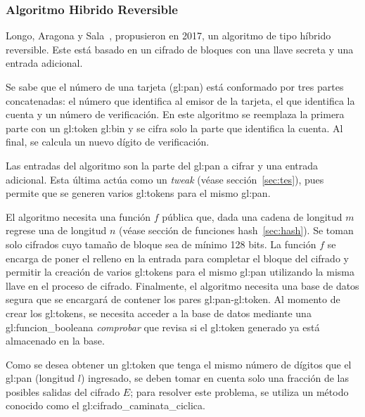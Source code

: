 %
%

\subsubsection{Algoritmo Hibrido Reversible}
\label{sec:ahr}
Longo, Aragona y Sala~\cite{aragona}, propusieron en 2017, un algoritmo de
tipo híbrido reversible. Este está basado en un cifrado de bloques con una
llave secreta y una entrada adicional.

Se sabe que el número de una tarjeta (\gls{gl:pan}) está conformado por tres
partes concatenadas: el número que identifica al emisor de la tarjeta, el que
identifica la cuenta y un número de verificación. En este algoritmo se reemplaza
la primera parte con un \gls{gl:token} \gls{gl:bin} y se cifra solo la parte
que identifica la cuenta. Al final, se calcula un nuevo dígito de verificación.

Las entradas del algoritmo son la parte del \gls{gl:pan} a cifrar y una entrada
adicional. Esta última actúa como un \textit{tweak} (véase
sección~\ref{sec:tes}), pues permite que se generen varios \glspl{gl:token}
para el mismo \gls{gl:pan}.

El algoritmo necesita una función $f$ pública que, dada una cadena
de longitud $m$ regrese una de longitud $n$ (véase sección de funciones
hash~\ref{sec:hash}). Se toman solo cifrados cuyo tamaño de bloque sea de
mínimo 128 bits. La función $f$ se encarga de poner el relleno en la entrada
para completar el bloque del cifrado y permitir la creación de varios
\glspl{gl:token} para el mismo \gls{gl:pan} utilizando la misma llave en el
proceso de cifrado. Finalmente, el algoritmo necesita una base de datos segura
que se encargará de contener los pares \gls{gl:pan}-\gls{gl:token}. Al momento
de crear los \glspl{gl:token}, se necesita acceder a la base de datos
mediante una \gls{gl:funcion_booleana} \textit{comprobar} que revisa si el
\gls{gl:token} generado ya está almacenado en la base.

Como se desea obtener un \gls{gl:token} que tenga el mismo número de dígitos
que el \gls{gl:pan} (longitud $l$) ingresado, se deben tomar en cuenta solo una
fracción de las posibles salidas del cifrado $E$; para resolver este problema,
se utiliza un método conocido como el \gls{gl:cifrado_caminata_ciclica}.

